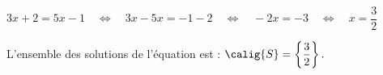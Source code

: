 $3x + 2 = 5x - 1 \quad \Leftrightarrow \quad 3x - 5x = -1 -2
\quad \Leftrightarrow \quad -2x = -3
\quad \Leftrightarrow \quad  x = \dfrac 32$

L'ensemble des solutions de l'équation est :
$\calig{S} = \left\{\dfrac 32\right\}.$